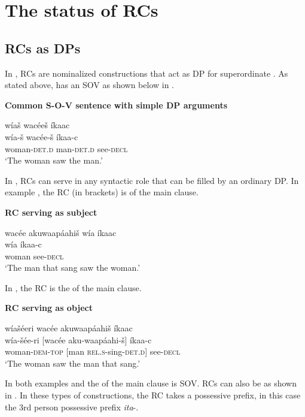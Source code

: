 \documentclass[output=paper]{LSP/langsci}
\begin{document}
\section{The status of  RCs}\label{sec:boyle:2}

\subsection{ RCs as DPs}\label{sec:boyle:2.1}

In , RCs are nominalized constructions that act as DP for superordinate . As stated above,  has an SOV  as shown below in .

\ea \textbf{Common S-O-V sentence with simple DP arguments} \label{boyle1}

\glll w\'ia\v{s} wac\'ee\v{s} \'ikaac\\
w\'ia-\v{s}  wac\'ee-\v{s} \'ikaa-c\\
woman-\textsc{det.d} man-\textsc{det.d} see-\textsc{decl}\\
\trans`The woman saw the man.' 
\z

In , RCs can serve in any syntactic role that can be filled by an ordinary DP. In example , the RC (in brackets) is  of the main clause.  

\ea \textbf{RC serving as subject} \label{boyle2}

\glll {\ob}wac\'ee akuwaap\'aahi\v{s}{\cb}  w\'ia \'ikaac\\	
[wac\'ee aku-waap\'aahi-\v{s}] w\'ia  \'ikaa-c\\
[man \textsc{rel.s}-sing-\textsc{det.d}] woman see-\textsc{decl}\\
\trans`The man that sang saw the woman.' 
\z

In , the RC is the  of the main clause.

\ea \textbf{RC serving as object} \label{boyle3}

\glll w\'ia\v{s}\'eeri  {\ob}wac\'ee akuwaap\'aahi\v{s}{\cb}  \'ikaac\\
w\'ia-\v{s}\'ee-ri  [wac\'ee aku-waap\'aahi-\v{s}] \'ikaa-c\\
woman-\textsc{dem-top} [man \textsc{rel.s}-sing-\textsc{det.d}] see-\textsc{decl}\\
\trans `The woman saw the man that sang.' 
\z

In both examples  and  the  of the main clause is SOV. RCs can also be  as shown in . In these types of constructions, the  RC takes a possessive prefix, in this case the 3rd person possessive prefix \textit{ita}-.
\end{document}
